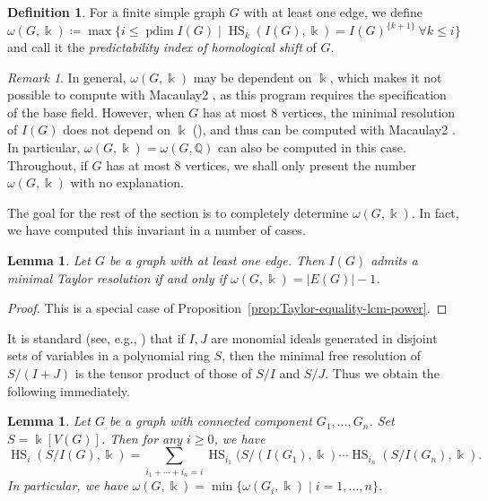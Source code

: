 \documentclass[reqno]{amsart}
\DeclareMathOperator{\pdim}{pdim}
\DeclareMathOperator{\HS}{HS}
\newtheorem{lemma}[theorem]{Lemma}
\theoremstyle{definition}
\newtheorem{definition}[theorem]{Definition}
\theoremstyle{remark}
\newtheorem{remark}[theorem]{Remark}
\numberwithin{equation}{section}
\begin{document}
\begin{definition}\label{def:omega-def}
    For a finite simple graph $G$ with at least one edge, we define
    \[
\omega(G,\Bbbk)\coloneqq  \max\{ i\leq \pdim I(G)\mid \HS_k(I(G),\Bbbk)=I(G)^{\{k+1\}}\ \forall k\leq i \}
\]
    and call it the \emph{predictability index of homological shift} of $G$.
\end{definition}

\begin{remark}
    In general, $\omega(G,\Bbbk)$ may be dependent on $\Bbbk$, which makes it not possible to compute with Macaulay2 \cite{M2}, as this program requires the specification of the base field. However, when $G$ has at most 8 vertices, the minimal resolution of $I(G)$ does not depend on $\Bbbk$ (\cite[Theorem 4.2]{ChauHaMaithani2026}), and thus can be computed with Macaulay2 \cite{M2}. In particular, $\omega(G,\Bbbk)=\omega(G,\mathbb{Q})$ can also be computed in this case. Throughout, if $G$ has at most 8 vertices, we shall only present the number $\omega(G,\Bbbk)$ with no  explanation.
\end{remark}

The goal for the rest of the section is to completely determine $\omega(G,\Bbbk)$. In fact, we have computed this invariant in a number of cases.

\begin{lemma}\label{lem:Taylor-omega}
    Let $G$ be a graph with at least one edge. Then $I(G)$ admits a minimal Taylor resolution if and only if $\omega(G,\Bbbk)=|E(G)|-1$.
\end{lemma}
\begin{proof}
    This is a special case of Proposition~\ref{prop:Taylor-equality-lcm-power}.
\end{proof}

It is standard (see, e.g., \cite[Lemma~2.1]{JacquesKatzman2005}) that if $I,J$ are monomial ideals generated in disjoint sets of variables in a polynomial ring $S$, then the minimal free resolution of $S/(I+J)$ is the tensor product of those of $S/I$ and $S/J$. Thus we obtain the following immediately.

\begin{lemma}
    Let $G$ be a graph with connected component $G_1,\dots, G_n$. Set $S=\Bbbk[V(G)]$. Then for any $i\geq 0$, we have
    \[
    \HS_{i}(S/I(G),\Bbbk) = \sum_{i_1+\cdots +i_n=i} \HS_{i_1}(S/(I(G_{1}),\Bbbk)\cdots  \HS_{i_n}(S/I(G_{n}),\Bbbk).
    \]
    In particular, we have $\omega(G,\Bbbk)=\min \{\omega(G_i,\Bbbk)\mid i=1,\dots, n  \}$.
\end{lemma}
\end{document}
